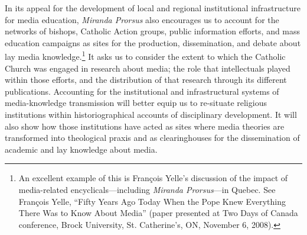 \documentclass{tufte-handout}
\begin{document}
In its appeal for the development of local and regional institutional
infrastructure for media education, \emph{Miranda Prorsus} also
encourages us to account for the networks of bishops, Catholic Action
groups, public information efforts, and mass education campaigns as
sites for the production, dissemination, and debate about lay media
knowledge.\footnote{An excellent example of this is François Yelle's
  discussion of the impact of media-related encyclicals---including
  \emph{Miranda Prorsus}---in Quebec. See François Yelle, ``Fifty Years
  Ago Today When the Pope Knew Everything There Was to Know About
  Media'' (paper presented at Two Days of Canada conference, Brock
  University, St. Catherine's, ON, November 6, 2008).} It asks us to
consider the extent to which the Catholic Church was engaged in research
about media; the role that intellectuals played within those efforts,
and the distribution of that research through its different
publications. Accounting for the institutional and infrastructural
systems of media-knowledge transmission will better equip us to
re-situate religious institutions within historiographical accounts of
disciplinary development. It will also show how those institutions have
acted as sites where media theories are transformed into theological
praxis and as clearinghouses for the dissemination of academic and lay
knowledge about media.
\end{document}
